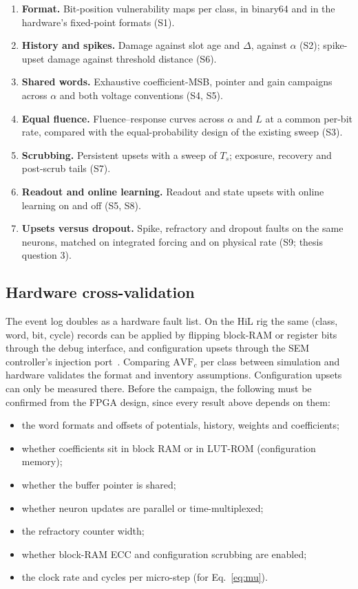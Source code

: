 \documentclass[11pt,a4paper]{article}
\newcommand{\AVF}{\mathrm{AVF}}
\begin{document}
\begin{enumerate}[label=E\arabic*.]
  \item \textbf{Format.} Bit-position vulnerability maps per class, in binary64 and in the hardware's fixed-point formats (S1).
  \item \textbf{History and spikes.} Damage against slot age and $\Delta$, against $\alpha$ (S2); spike-upset damage against threshold distance (S6).
  \item \textbf{Shared words.} Exhaustive coefficient-MSB, pointer and gain campaigns across $\alpha$ and both voltage conventions (S4, S5).
  \item \textbf{Equal fluence.} Fluence--response curves across $\alpha$ and $L$ at a common per-bit rate, compared with the equal-probability design of the existing sweep (S3).
  \item \textbf{Scrubbing.} Persistent upsets with a sweep of $T_s$; exposure, recovery and post-scrub tails (S7).
  \item \textbf{Readout and online learning.} Readout and state upsets with online learning on and off (S5, S8).
  \item \textbf{Upsets versus dropout.} Spike, refractory and dropout faults on the same neurons, matched on integrated forcing and on physical rate (S9; thesis question 3).
\end{enumerate}

\subsection{Hardware cross-validation}
\label{sec:hil}

The event log doubles as a hardware fault list. On the HiL rig the same (class, word, bit, cycle) records can be applied by flipping block-RAM or register bits through the debug interface, and configuration upsets through the SEM controller's injection port~\cite{amd_sem}. Comparing $\AVF_c$ per class between simulation and hardware validates the format and inventory assumptions. Configuration upsets can only be measured there. Before the campaign, the following must be confirmed from the FPGA design, since every result above depends on them:
\begin{itemize}
  \item the word formats and offsets of potentials, history, weights and coefficients;
  \item whether coefficients sit in block RAM or in LUT-ROM (configuration memory);
  \item whether the buffer pointer is shared;
  \item whether neuron updates are parallel or time-multiplexed;
  \item the refractory counter width;
  \item whether block-RAM ECC and configuration scrubbing are enabled;
  \item the clock rate and cycles per micro-step (for Eq.~\eqref{eq:mu}).
\end{itemize}
\end{document}
